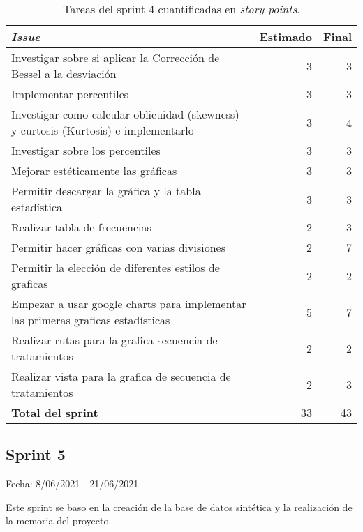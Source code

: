 \begin{table}[H]
	 \begin{tabularx}{\linewidth}{X r r}
	 	\toprule \textbf{\textit{Issue}} & \textbf{Estimado} & \textbf{Final}\\
	 	\toprule
	 	Investigar sobre si aplicar la Corrección de Bessel a la desviación & 3 & 3 \\
        Implementar percentiles & 3 & 3 \\
        Investigar como calcular oblicuidad (skewness) y curtosis (Kurtosis) e implementarlo  & 3 & 4 \\
        Investigar sobre los percentiles & 3 & 3 \\
        Mejorar estéticamente las gráficas & 3 & 3 \\
        Permitir descargar la gráfica y la tabla estadística & 3 & 3 \\
        Realizar tabla de frecuencias & 2 & 3 \\
        Permitir hacer gráficas con varias divisiones & 2 & 7 \\
        Permitir la elección de diferentes estilos de graficas & 2 & 2 \\
        Empezar a usar google charts para implementar las primeras graficas estadísticas & 5 & 7 \\
        Realizar rutas para la grafica secuencia de tratamientos & 2 & 2 \\
        Realizar vista para la grafica de secuencia de tratamientos & 2 & 3 \\
        \midrule
	    \textbf{Total del sprint} & 33 & 43 \\
	 	\bottomrule
	 \end{tabularx}
	 \caption{Tareas del sprint 4 cuantificadas en \textit{story points}.}
\end{table}

\subsection{Sprint 5}

Fecha: 8/06/2021 - 21/06/2021

Este sprint se baso en la creación de la base de datos sintética y la realización de la memoria del proyecto.



